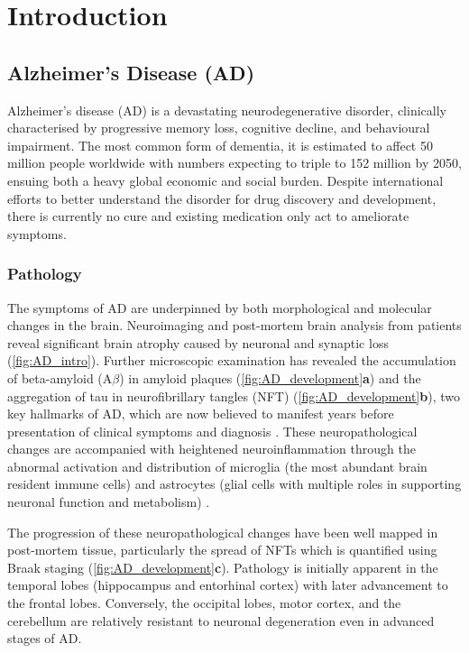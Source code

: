 \chapter{Introduction}

\section{Alzheimer's Disease (AD)}

Alzheimer’s disease (AD) is a devastating neurodegenerative disorder, clinically characterised by progressive memory loss, cognitive decline, and behavioural impairment. The most common form of dementia, it is estimated to affect 50 million people worldwide with numbers expecting to triple to 152 million by 2050, ensuing both a heavy global economic and social burden\cite{International2020}. Despite international efforts to better understand the disorder for drug discovery and development, there is currently no cure and existing medication only act to ameliorate symptoms.

\subsection{Pathology}
The symptoms of AD are underpinned by both morphological and molecular changes in the brain. Neuroimaging and post-mortem brain analysis from patients reveal significant brain atrophy caused by neuronal and synaptic loss\cite{Selkoe1991,Perl2010} (\cref{fig:AD_intro}). Further microscopic examination has revealed the accumulation of beta-amyloid (A$\beta$) in amyloid plaques (\cref{fig:AD_development}\textbf{a}) and the aggregation of tau in neurofibrillary tangles (NFT) (\cref{fig:AD_development}\textbf{b}), two key hallmarks of AD, which are now believed to manifest years before presentation of clinical symptoms and diagnosis \cite{Sperling2011}. These neuropathological changes are accompanied with heightened neuroinflammation through the abnormal activation and distribution of microglia (the most abundant brain resident immune cells) and astrocytes (glial cells with multiple roles in supporting neuronal function and metabolism) \cite{Heneka2015}. 

The progression of these neuropathological changes have been well mapped in post-mortem tissue, particularly the spread of NFTs which is quantified using Braak staging\cite{H1991} (\cref{fig:AD_development}\textbf{c}). Pathology is initially apparent in the temporal lobes (hippocampus and entorhinal cortex) with later advancement to the frontal lobes. Conversely, the occipital lobes, motor cortex, and the cerebellum are relatively resistant to neuronal degeneration even in advanced stages of AD\cite{Xu2019}.


